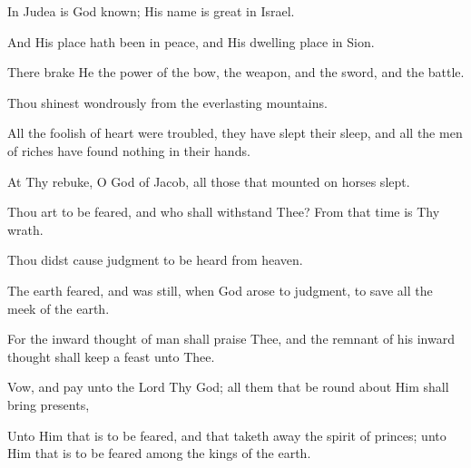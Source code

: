 In Judea is God known; His name is great in Israel.

And His place hath been in peace, and His dwelling place in Sion.

There brake He the power of the bow, the weapon, and the sword, and the battle.

Thou shinest wondrously from the everlasting mountains.

All the foolish of heart were troubled, they have slept their sleep, and all the men of riches have found nothing in their hands.

At Thy rebuke, O God of Jacob, all those that mounted on horses slept.

Thou art to be feared, and who shall withstand Thee? From that time is Thy wrath.

Thou didst cause judgment to be heard from heaven.

The earth feared, and was still, when God arose to judgment, to save all the meek of the earth.

For the inward thought of man shall praise Thee, and the remnant of his inward thought shall keep a feast unto Thee.

Vow, and pay unto the Lord Thy God; all them that be round about Him shall bring presents,

Unto Him that is to be feared, and that taketh away the spirit of princes; unto Him that is to be feared among the kings of the earth.
